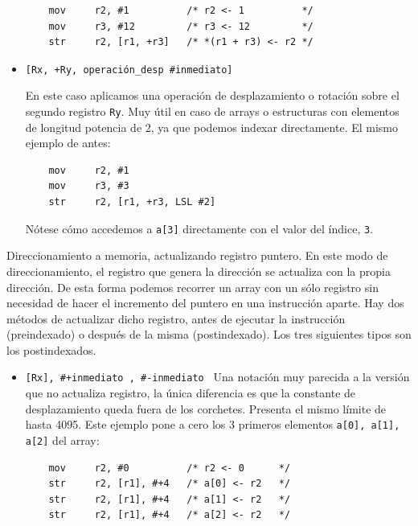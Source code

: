 \begin{descript}
\begin{itemize}
\begin{lstlisting}
    mov     r2, #1          /* r2 <- 1          */
    mov     r3, #12         /* r3 <- 12         */
    str     r2, [r1, +r3]   /* *(r1 + r3) <- r2 */
\end{lstlisting}

  \item{\tt [Rx, +Ry, operación\_desp \#inmediato]  \newline}

    En este caso aplicamos una operación de desplazamiento
    o rotación sobre el segundo registro {\tt Ry}. Muy útil
    en caso de arrays o estructuras con elementos de longitud
    potencia de 2, ya que podemos indexar directamente. El
    mismo ejemplo de antes:
    
\begin{lstlisting}
    mov     r2, #1
    mov     r3, #3
    str     r2, [r1, +r3, LSL #2]
\end{lstlisting}

    Nótese cómo accedemos a {\tt a[3]}
    directamente con el valor del índice, {\tt 3}.
\end{itemize}


  \item[Direccionamiento a memoria, actualizando registro puntero.]
    En este modo de direccionamiento, el registro que genera la dirección
    se actualiza con la propia dirección. De esta forma podemos recorrer
    un array con un sólo registro sin necesidad de hacer el incremento del
    puntero en una instrucción aparte. Hay dos métodos de actualizar dicho
    registro, antes de ejecutar la instrucción (preindexado) o después
    de la misma (postindexado). Los tres siguientes tipos son los
    postindexados.

\begin{itemize}
  \item{\tt [Rx], \#+inmediato \newline
            [Rx], \#-inmediato \newline}
    Una notación muy parecida a la versión que no actualiza registro, la única
    diferencia es que la constante de desplazamiento queda fuera de los corchetes.
    Presenta el mismo límite de hasta 4095. Este ejemplo pone a cero los 3 primeros
    elementos {\tt a[0], a[1], a[2]} del array:

\begin{lstlisting}
    mov     r2, #0          /* r2 <- 0      */
    str     r2, [r1], #+4   /* a[0] <- r2   */
    str     r2, [r1], #+4   /* a[1] <- r2   */
    str     r2, [r1], #+4   /* a[2] <- r2   */
\end{lstlisting}


\end{itemize}
\end{descript}
